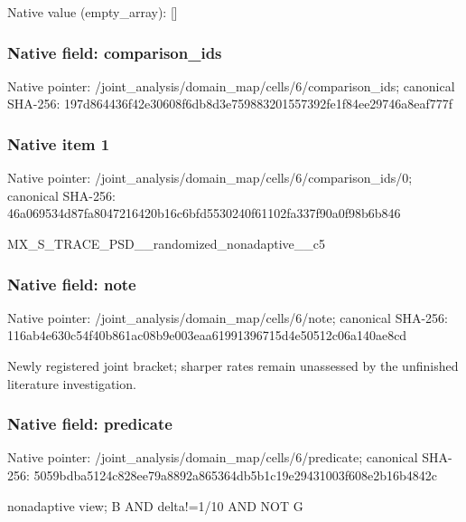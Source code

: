\documentclass[10pt,a4paper]{article}
\begin{document}
Native value (empty\_\allowbreak{}array): []

\subsubsection{Native field: comparison\_\allowbreak{}ids}
Native pointer: /joint\_\allowbreak{}analysis/domain\_\allowbreak{}map/cells/6/comparison\_\allowbreak{}ids; canonical SHA-256: 197d864436f42e30608f6db8d3e759883201557392fe1f84ee29746a8eaf777f

\subsubsection{Native item 1}
Native pointer: /joint\_\allowbreak{}analysis/domain\_\allowbreak{}map/cells/6/comparison\_\allowbreak{}ids/0; canonical SHA-256: 46a069534d87fa8047216420b16c6bfd5530240f61102fa337f90a0f98b6b846

\begingroup\raggedright\sloppy MX\_\allowbreak{}S\_\allowbreak{}TRACE\_\allowbreak{}PSD\_\allowbreak{}\_\allowbreak{}randomized\_\allowbreak{}nonadaptive\_\allowbreak{}\_\allowbreak{}c5\par\endgroup

\subsubsection{Native field: note}
Native pointer: /joint\_\allowbreak{}analysis/domain\_\allowbreak{}map/cells/6/note; canonical SHA-256: 116ab4e630c54f40b861ac08b9e003eaa61991396715d4e50512c06a140ae8cd

\begingroup\raggedright\sloppy Newly registered joint bracket;\allowbreak{} sharper rates remain unassessed by the unfinished literature investigation.\par\endgroup

\subsubsection{Native field: predicate}
Native pointer: /joint\_\allowbreak{}analysis/domain\_\allowbreak{}map/cells/6/predicate; canonical SHA-256: 5059bdba5124c828ee79a8892a865364db5b1c19e29431003f608e2b16b4842c

\begingroup\raggedright\sloppy nonadaptive view;\allowbreak{} B AND delta!=\allowbreak{}1/\allowbreak{}10 AND NOT G\par\endgroup
\end{document}
